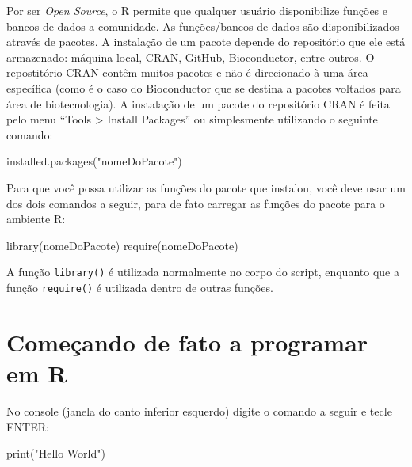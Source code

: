 \documentclass[
]{book}
\newenvironment{Shaded}{\begin{snugshade}}{\end{snugshade}}
\newcommand{\FunctionTok}[1]{\textcolor[rgb]{0.00,0.00,0.00}{#1}}
\newcommand{\NormalTok}[1]{#1}
\newcommand{\StringTok}[1]{\textcolor[rgb]{0.31,0.60,0.02}{#1}}
\begin{document}
Por ser \emph{Open Source}, o R permite que qualquer usuário disponibilize funções e bancos de dados a comunidade. As funções/bancos de dados são disponibilizados através de pacotes. A instalação de um pacote depende do repositório que ele está armazenado: máquina local, CRAN, GitHub, Bioconductor, entre outros. O repostitório CRAN contêm muitos pacotes e não é direcionado à uma área específica (como é o caso do Bioconductor que se destina a pacotes voltados para área de biotecnologia). A instalação de um pacote do repositório CRAN é feita pelo menu ``Tools \textgreater{} Install Packages'' ou simplesmente utilizando o seguinte comando:

\begin{Shaded}
\begin{Highlighting}[]
\FunctionTok{installed.packages}\NormalTok{(}\StringTok{"nomeDoPacote"}\NormalTok{)}
\end{Highlighting}
\end{Shaded}

Para que você possa utilizar as funções do pacote que instalou, você deve usar um dos dois comandos a seguir, para de fato carregar as funções do pacote para o ambiente R:

\begin{Shaded}
\begin{Highlighting}[]
\FunctionTok{library}\NormalTok{(nomeDoPacote)}
\FunctionTok{require}\NormalTok{(nomeDoPacote)}
\end{Highlighting}
\end{Shaded}

A função \texttt{library()} é utilizada normalmente no corpo do script, enquanto que a função \texttt{require()} é utilizada dentro de outras funções.

\hypertarget{comeuxe7ando-de-fato-a-programar-em-r}{%
\section{Começando de fato a programar em R}\label{comeuxe7ando-de-fato-a-programar-em-r}}

No console (janela do canto inferior esquerdo) digite o comando a seguir e tecle ENTER:

\begin{Shaded}
\begin{Highlighting}[]
\FunctionTok{print}\NormalTok{(}\StringTok{"Hello World"}\NormalTok{)}
\end{Highlighting}
\end{Shaded}
\end{document}
